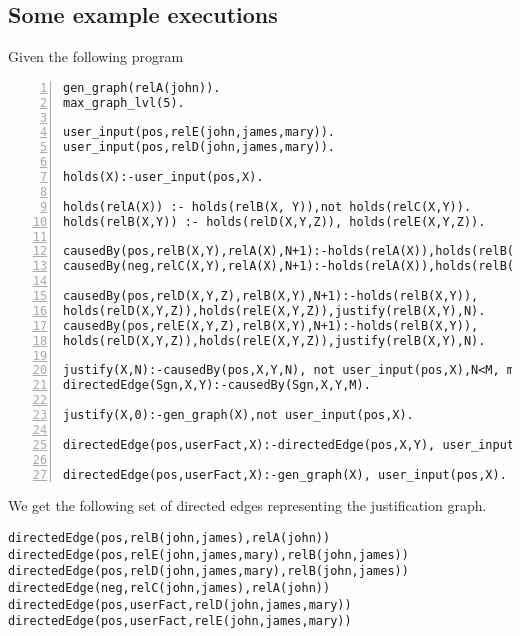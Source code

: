 \subsection{Some example executions}
Given the following program
\begin{lstlisting}[numbers=left]
gen_graph(relA(john)).
max_graph_lvl(5).

user_input(pos,relE(john,james,mary)).
user_input(pos,relD(john,james,mary)). 

holds(X):-user_input(pos,X).

holds(relA(X)) :- holds(relB(X, Y)),not holds(relC(X,Y)).
holds(relB(X,Y)) :- holds(relD(X,Y,Z)), holds(relE(X,Y,Z)).

causedBy(pos,relB(X,Y),relA(X),N+1):-holds(relA(X)),holds(relB(X, Y)),not holds(relC(X,Y)),justify(relA(X),N).
causedBy(neg,relC(X,Y),relA(X),N+1):-holds(relA(X)),holds(relB(X, Y)),not holds(relC(X,Y)),justify(relA(X),N).

causedBy(pos,relD(X,Y,Z),relB(X,Y),N+1):-holds(relB(X,Y)),
holds(relD(X,Y,Z)),holds(relE(X,Y,Z)),justify(relB(X,Y),N).
causedBy(pos,relE(X,Y,Z),relB(X,Y),N+1):-holds(relB(X,Y)),
holds(relD(X,Y,Z)),holds(relE(X,Y,Z)),justify(relB(X,Y),N).

justify(X,N):-causedBy(pos,X,Y,N), not user_input(pos,X),N<M, max_graph_lvl(M).
directedEdge(Sgn,X,Y):-causedBy(Sgn,X,Y,M).

justify(X,0):-gen_graph(X),not user_input(pos,X).

directedEdge(pos,userFact,X):-directedEdge(pos,X,Y), user_input(pos,X).

directedEdge(pos,userFact,X):-gen_graph(X), user_input(pos,X).
\end{lstlisting}
We get the following set of directed edges representing the justification graph. 
\begin{lstlisting}[frame=none]
directedEdge(pos,relB(john,james),relA(john))
directedEdge(pos,relE(john,james,mary),relB(john,james))
directedEdge(pos,relD(john,james,mary),relB(john,james))
directedEdge(neg,relC(john,james),relA(john))
directedEdge(pos,userFact,relD(john,james,mary))
directedEdge(pos,userFact,relE(john,james,mary))
\end{lstlisting}



